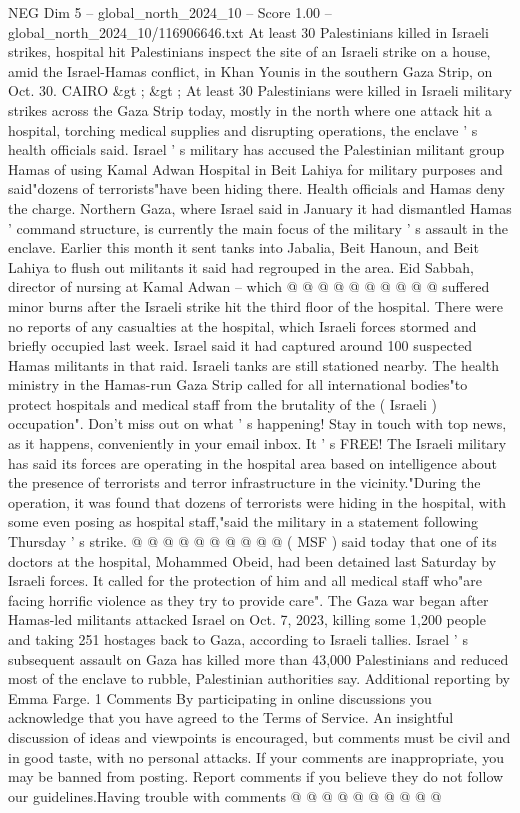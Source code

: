 \begin{textsample}{NEG Dim 5 – global\_north\_2024\_10 – Score 1.00 – global\_north\_2024\_10/116906646.txt}  \label{ex:f5_neg_042}
At least 30 Palestinians killed in Israeli strikes, hospital hit Palestinians inspect the site of an Israeli strike on a house, amid the Israel-Hamas conflict, in Khan Younis in the southern Gaza Strip, on Oct. 30.
CAIRO \&gt ; \&gt ; At least 30 Palestinians were killed in Israeli military strikes across the Gaza Strip today, mostly in the north where one attack hit a hospital, torching medical supplies and disrupting operations, the enclave ' s health officials said.
Israel ' s military has accused the Palestinian militant group Hamas of using Kamal Adwan Hospital in Beit Lahiya for military purposes and said"dozens of terrorists"have been hiding there.
Health officials and Hamas deny the charge.
Northern Gaza, where Israel said in January it had dismantled Hamas ' command structure, is currently the main focus of the military ' s assault in the enclave.
Earlier this month it sent tanks into Jabalia, Beit Hanoun, and Beit Lahiya to flush out militants it said had regrouped in the area.
Eid Sabbah, director of nursing at Kamal Adwan -- which @ @ @ @ @ @ @ @ @ @ suffered minor burns after the Israeli strike hit the third floor of the hospital.
There were no reports of any casualties at the hospital, which Israeli forces stormed and briefly occupied last week.
Israel said it had captured around 100 suspected Hamas militants in that raid.
Israeli tanks are still stationed nearby.
The health ministry in the Hamas-run Gaza Strip called for all international bodies"to protect hospitals and medical staff from the brutality of the ( Israeli ) occupation".
Don't miss out on what ' s happening!
Stay in touch with top news, as it happens, conveniently in your email inbox.
It ' s FREE!
The Israeli military has said its forces are operating in the hospital area based on intelligence about the presence of terrorists and terror infrastructure in the vicinity."During the operation, it was found that dozens of terrorists were hiding in the hospital, with some even posing as hospital staff,"said the military in a statement following Thursday ' s strike. @ @ @ @ @ @ @ @ @ @ ( MSF ) said today that one of its doctors at the hospital, Mohammed Obeid, had been detained last Saturday by Israeli forces.
It called for the protection of him and all medical staff who"are facing horrific violence as they try to provide care".
The Gaza war began after Hamas-led militants attacked Israel on Oct. 7, 2023, killing some 1,200 people and taking 251 hostages back to Gaza, according to Israeli tallies.
Israel ' s subsequent assault on Gaza has killed more than 43,000 Palestinians and reduced most of the enclave to rubble, Palestinian authorities say.
Additional reporting by Emma Farge. 1 Comments By participating in online discussions you acknowledge that you have agreed to the Terms of Service.
An insightful discussion of ideas and viewpoints is encouraged, but comments must be civil and in good taste, with no personal attacks.
If your comments are inappropriate, you may be banned from posting.
Report comments if you believe they do not follow our guidelines.Having trouble with comments @ @ @ @ @ @ @ @ @ @

\end{textsample}
